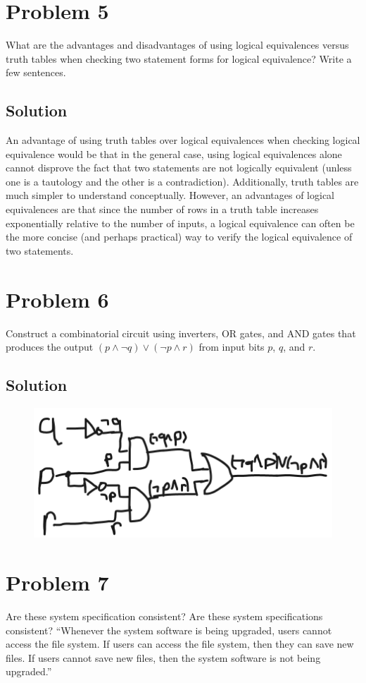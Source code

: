 \documentclass[table]{article}
\begin{document}
\section{Problem 5}
What are the advantages and disadvantages of using logical equivalences versus truth tables when checking two statement forms for logical equivalence? Write a few sentences.
\subsection{Solution}
An advantage of using truth tables over logical equivalences when checking logical equivalence would be that in the general case, using logical equivalences alone cannot disprove the fact that two statements are not logically equivalent (unless one is a tautology and the other is a contradiction). Additionally, truth tables are much simpler to understand conceptually. However, an advantages of logical equivalences are that since the number of rows in a truth table increases exponentially relative to the number of inputs, a logical equivalence can often be the more concise (and perhaps practical) way to verify the logical equivalence of two statements.
\pagebreak
\section{Problem 6}
Construct a combinatorial circuit using inverters, OR gates, and AND gates that produces the output $(p \land \neg q) \lor (\neg p \land r)$ from input bits $p$, $q$, and $r$.
\subsection{Solution}
\begin{figure}[h!]
	\includegraphics[scale=.545]{images/Prob6Solution.png}
\end{figure}
\section{Problem 7}
Are these system specification consistent?
Are these system specifications consistent? ``Whenever the system software is being upgraded, users cannot access the file system. If users can access the file system, then they can save new files. If users cannot save new files, then the system software is not being upgraded.''
\end{document}
